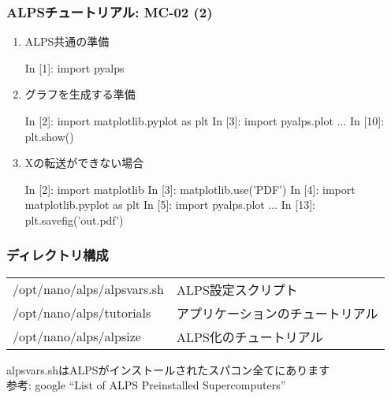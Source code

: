 \begin{frame}[fragile,shrink=5]
  \frametitle{ALPSチュートリアル: MC-02 (2)}
  \begin{enumerate}
  \item<2-> ALPS共通の準備
\begin{semiverbatim}
In [1]: import pyalps
\end{semiverbatim}
  \item<3-> グラフを生成する準備
\begin{semiverbatim}
In [2]: import matplotlib.pyplot as plt
In [3]: import pyalps.plot
...
In [10]: plt.show()
\end{semiverbatim}
  \item<3-> Xの転送ができない場合
\begin{semiverbatim}
In [2]: import matplotlib
In [3]: matplotlib.use('PDF')
In [4]: import matplotlib.pyplot as plt
In [5]: import pyalps.plot
...
In [13]: plt.savefig('out.pdf')
\end{semiverbatim}
  \end{enumerate}
\end{frame}

\begin{frame}
  \frametitle{ディレクトリ構成}
  \begin{tabular}{ll}
    /opt/nano/alps/alpsvars.sh & ALPS設定スクリプト \\
    /opt/nano/alps/tutorials & アプリケーションのチュートリアル \\
    /opt/nano/alps/alpsize   & ALPS化のチュートリアル
  \end{tabular}
  \begin{alertblock}{}
    alpsvars.shはALPSがインストールされたスパコン全てにあります \\
    参考: google ``List of ALPS Preinstalled Supercomputers''
\end{alertblock}
\end{frame}



